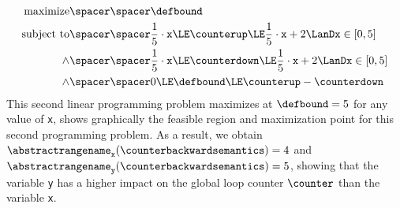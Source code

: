 \begin{example}
  \begin{align*}
    \text{maximize} \spacer\spacer& \defbound \\
    \text{subject to} \spacer\spacer & \frac{1}{5}\cdot\texttt{x} \LE \counterup \LE \frac{1}{5}\cdot\texttt{x}+2 \LanD \texttt{x} \in [0, 5] \\
    \land\spacer\spacer& \frac{1}{5}\cdot\texttt{x} \LE \counterdown \LE \frac{1}{5}\cdot\texttt{x}+2 \LanD \texttt{x} \in [0, 5] \\
    \land\spacer\spacer& 0 \LE \defbound \LE \counterup - \counterdown
  \end{align*}
  This second linear programming problem maximizes at $\defbound=5$ for any value of \texttt{x},  shows graphically the feasible region and maximization point for this second programming problem.
  As a result, we obtain $\abstractrangename_{\texttt{x}}(\counterbackwardsemantics) = 4$ and $\abstractrangename_{\texttt{y}}(\counterbackwardsemantics) = 5$, showing that the variable \texttt{y} has a higher impact on the global loop counter $\counter$ than the variable \texttt{x}.
\end{example}



